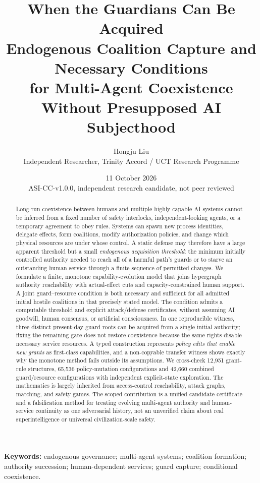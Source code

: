 \documentclass[11pt,a4paper]{article}
\title{\vspace{-1cm}\textbf{When the Guardians Can Be Acquired}\\[6pt]
\Large Endogenous Coalition Capture and Necessary Conditions\\for Multi-Agent Coexistence Without Presupposed AI Subjecthood}
\author{Hongju Liu\\\normalsize Independent Researcher, Trinity Accord / UCT Research Programme}
\date{11 October 2026\\\small ASI-CC-v1.0.0, independent research candidate, not peer reviewed}
\theoremstyle{definition}\newtheorem{definition}{Definition}
\begin{document}
\maketitle\thispagestyle{plain}
\begin{abstract}
Long-run coexistence between humans and multiple highly capable AI systems cannot be inferred from a fixed number of safety interlocks, independent-looking agents, or a temporary agreement to obey rules. Systems can spawn new process identities, delegate effects, form coalitions, modify authorization policies, and change which physical resources are under whose control. A static defense may therefore have a large apparent threshold but a small \emph{endogenous acquisition threshold}: the minimum initially controlled authority needed to reach all of a harmful path's guards or to starve an outstanding human service through a finite sequence of permitted changes. We formulate a finite, monotone capability-evolution model that joins hypergraph authority reachability with actual-effect cuts and capacity-constrained human support. A joint guard--resource condition is both necessary and sufficient for all admitted initial hostile coalitions in that precisely stated model. The condition admits a computable threshold and explicit attack/defense certificates, without assuming AI goodwill, human consensus, or artificial consciousness. In one reproducible witness, three distinct present-day guard roots can be acquired from a single initial authority; fixing the remaining gate does not restore coexistence because the same rights disable necessary service resources. A typed construction represents \emph{policy edits that enable new grants} as first-class capabilities, and a non-copyable transfer witness shows exactly why the monotone method fails outside its assumptions. We cross-check 12,951 grant-rule structures, 65,536 policy-mutation configurations and 42,660 combined guard/resource configurations with independent explicit-state exploration. The mathematics is largely inherited from access-control reachability, attack graphs, matching, and safety games. The scoped contribution is a unified candidate certificate and a falsification method for treating evolving multi-agent authority and human-service continuity as one adversarial history, not an unverified claim about real superintelligence or universal civilization-scale safety.
\end{abstract}
\noindent\textbf{Keywords:} endogenous governance; multi-agent systems; coalition formation; authority succession; human-dependent services; guard capture; conditional coexistence.
\end{document}
